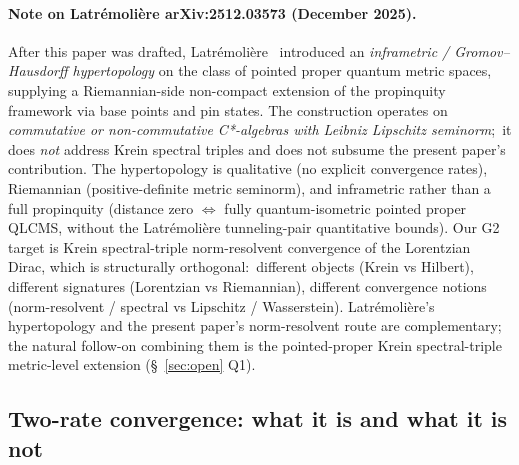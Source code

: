\documentclass[11pt,a4paper]{article}
\theoremstyle{plain}
\theoremstyle{definition}
\begin{document}
\paragraph*{Note on Latr\'emoli\`ere arXiv:2512.03573 (December 2025).}
After this paper was drafted,
Latr\'emoli\`ere~\cite{latremoliere2025_hypertopology} introduced an
\emph{inframetric / Gromov--Hausdorff hypertopology} on the class of
pointed proper quantum metric spaces, supplying a Riemannian-side
non-compact extension of the propinquity framework via base points and
pin states. The construction operates on \emph{commutative or
non-commutative C*-algebras with Leibniz Lipschitz seminorm};\ it does
\emph{not} address Krein spectral triples and does not subsume the
present paper's contribution. The hypertopology is qualitative (no
explicit convergence rates), Riemannian (positive-definite metric
seminorm), and inframetric rather than a full propinquity (distance
zero $\Leftrightarrow$ fully quantum-isometric pointed proper QLCMS,
without the Latr\'emoli\`ere tunneling-pair quantitative bounds).
Our G2 target is Krein spectral-triple norm-resolvent convergence of
the Lorentzian Dirac, which is structurally orthogonal:\ different
objects (Krein vs Hilbert), different signatures (Lorentzian vs
Riemannian), different convergence notions (norm-resolvent / spectral
vs Lipschitz / Wasserstein). Latr\'emoli\`ere's hypertopology and the
present paper's norm-resolvent route are complementary; the natural
follow-on combining them is the pointed-proper Krein spectral-triple
metric-level extension (\S~\ref{sec:open} Q1).

\subsection{Two-rate convergence: what it is and what it is not}
\label{sec:two_rate_explanation}
\end{document}
